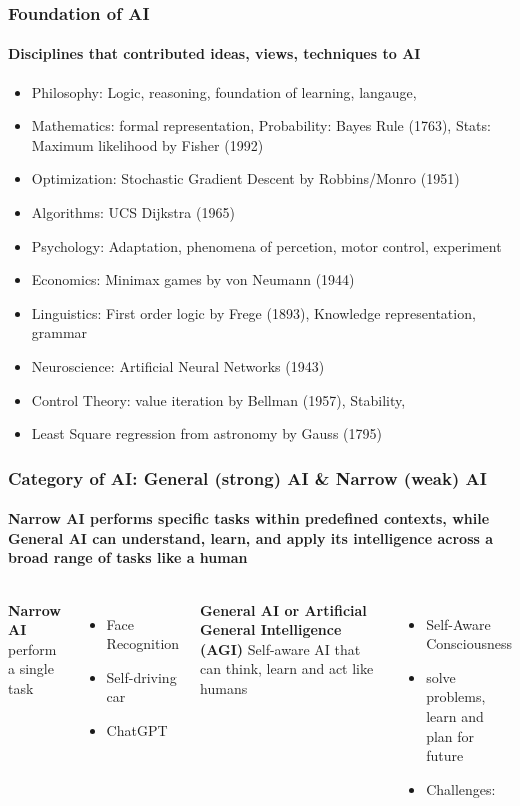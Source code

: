 \documentclass{beamer}
\begin{document}
\begin{frame}
  \frametitle{Foundation of AI}
  \framesubtitle{Disciplines that contributed ideas, views, techniques to AI}
  \begin{itemize}
    \item Philosophy: Logic, reasoning, foundation of learning, langauge,
    \item Mathematics: formal representation, Probability: Bayes Rule (1763), Stats: Maximum likelihood by Fisher (1992)
    \item Optimization: Stochastic Gradient Descent by Robbins/Monro (1951)
    \item Algorithms: UCS Dijkstra (1965)
    \item Psychology:  Adaptation, phenomena of percetion, motor control, experiment
    \item Economics: Minimax games by von Neumann (1944)
    \item Linguistics: First order logic by Frege (1893), Knowledge representation, grammar
    \item Neuroscience: Artificial Neural Networks (1943)
    \item Control Theory: value iteration by Bellman (1957), Stability,
    \item Least Square regression from astronomy by Gauss (1795)
  \end{itemize}
\end{frame}

\begin{frame}
  \frametitle{Category of AI: General (strong) AI \& Narrow (weak) AI}
  \framesubtitle{\textbf{Narrow AI} performs specific tasks within predefined contexts, while \textbf{General AI} can understand, learn, and apply its intelligence across a broad range of tasks like a human}

  \begin{columns}
    \textbf{Narrow AI} perform a single task
    \begin{itemize}
      \item Face Recognition
      \item Self-driving car
      \item ChatGPT
    \end{itemize}

    \textbf{General AI or Artificial General Intelligence (AGI)} Self-aware AI that can think, learn and act like humans
    \begin{itemize}
      \item Self-Aware Consciousness
      \item solve problems, learn and plan for future
      \item Challenges: 
    \end{itemize}
  \end{columns}
  
\end{frame}
\end{document}
